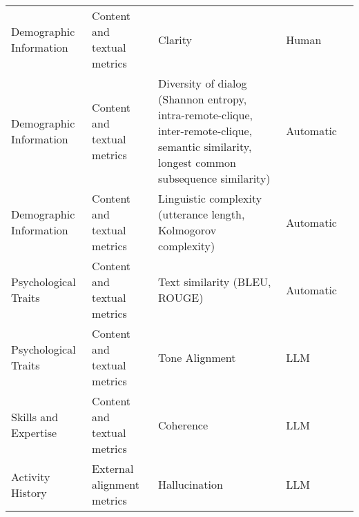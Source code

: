 \begin{small}
\begin{center}
\begin{longtable}{@{}p{}p{}p{}p{}p{}@{}}
Demographic Information & Content and textual metrics         & Clarity                                                                                                                                     & Human             & \cite{10.1145/3613904.3642363}                                                                                                                \\
Demographic Information & Content and textual metrics         & Diversity of dialog (Shannon entropy, intra-remote-clique, inter-remote-clique, semantic similarity, longest common subsequence similarity) & Automatic         & \cite{Ha2024CloChatUH}                                                                                                             \\
Demographic Information & Content and textual metrics         & Linguistic complexity (utterance length, Kolmogorov complexity)                                                                             & Automatic         & \cite{milivcka2024large}                                                                                      \\
Psychological Traits    & Content and textual metrics         & Text similarity (BLEU, ROUGE)                                                                                                               & Automatic         & \cite{zeng2024persllm}                                                                                                                               \\
Psychological Traits    & Content and textual metrics         & Tone Alignment                                                                                                                              & LLM               & \cite{zeng2024persllm}                                                                                                                            \\
Skills and Expertise    & Content and textual metrics         & Coherence                                                                                                                                   & LLM               & \cite{Li2024SchemaGuidedCC}                                                                                                                \\
Activity History        & External alignment metrics          & Hallucination                                                                                                                               & LLM               & \cite{shao2023character}                                                                                                           \\

\end{longtable}
\end{center}
\end{small}
